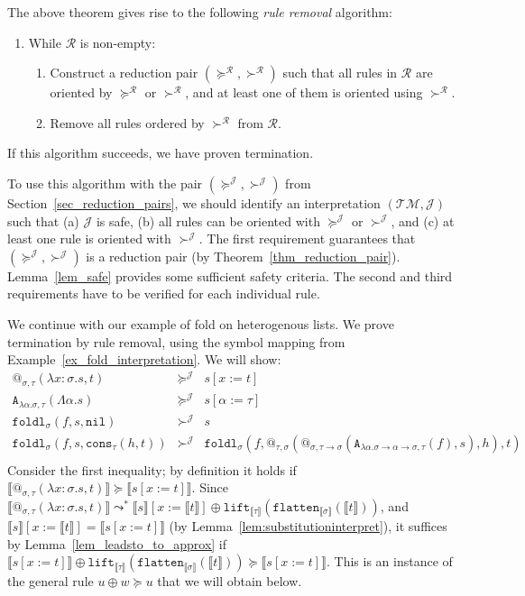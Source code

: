 \documentclass[a4paper,UKenglish,cleveref,autoref,numberwithinsect]{lipics-v2019}
\theoremstyle{definition}
\newcommand{\Rules}{\mathcal{R}}
\newcommand{\arrtype}{\rightarrow}
\newcommand{\abs}[2]{\lambda #1.#2}
\newcommand{\tabs}[2]{\Lambda #1.#2}
\newcommand{\arrW}{\leadsto}
\newcommand{\flatten}{\mathtt{flatten}}
\newcommand{\lift}{\mathtt{lift}}
\newcommand{\typeinterpret}[1]{\llbracket #1 \rrbracket}
\newcommand{\interpret}[1]{\llbracket #1 \rrbracket}
\newcommand{\Typemap}{\mathcal{T\!M}}
\newcommand{\Termmap}{\mathcal{J}}
\newcommand{\succinterpret}{\succ^{\Termmap}}
\newcommand{\succeqinterpret}{\succeq^{\Termmap}}
\newcommand{\nil}{\mathtt{nil}}
\newcommand{\cons}{\mathtt{cons}}
\begin{document}
The above theorem gives rise to the following \emph{rule removal}
algorithm:
\begin{enumerate}
\item While $\Rules$ is non-empty:
  \begin{enumerate}
  \item Construct a reduction pair $(\succeq^\Rules,\succ^\Rules)$
    such that all rules in $\Rules$ are oriented by $\succeq^\Rules$ or
    $\succ^\Rules$, and at least one of them is oriented using
    $\succ^\Rules$.
  \item Remove all rules ordered by $\succ^\Rules$ from $\Rules$.
  \end{enumerate}
\end{enumerate}
If this algorithm succeeds, we have proven termination.

\medskip
To use this algorithm with the pair $(\succeqinterpret,\succinterpret)$
from Section~\ref{sec_reduction_pairs}, we should identify an
interpretation $(\Typemap,\Termmap)$
such that (a) $\Termmap$ is safe, (b) all rules can be oriented with
$\succeqinterpret$ or $\succinterpret$, and (c) at least one rule is
oriented with $\succinterpret$.
%
The first requirement guarantees that
$(\succeqinterpret,\succinterpret)$ is a reduction pair (by
Theorem~\ref{thm_reduction_pair}). Lemma~\ref{lem_safe} provides some
sufficient safety criteria. The second and third
requirements have to be verified for each individual rule.

\begin{example}\label{ex_fold_intermediate}
  We continue with our example of fold on heterogenous lists. We prove
  termination by rule removal, using the symbol mapping from
  Example~\ref{ex_fold_interpretation}.
  We will show:
  \[
  \begin{array}{rcl}
    @_{\sigma,\tau}(\abs{x:\sigma}{s},t) & \succeqinterpret & s[x:=t] \\
    \mathtt{A}_{\abs{\alpha}{\sigma},\tau}(\tabs{\alpha}{s}) &
      \succeqinterpret & s[\alpha:=\tau] \\
    \mathtt{foldl}_\sigma(f,s,\nil) & \succinterpret & s \\
    \mathtt{foldl}_\sigma(f,s,\cons_\tau(h,t)) & \succinterpret &
    \mathtt{foldl}_\sigma(f,@_{\tau,\sigma}(@_{\sigma,\tau
    \arrtype\sigma}(
      \mathtt{A}_{\abs{\alpha}{\sigma\arrtype\alpha\arrtype\sigma},
      \tau}(f),s),h),t) \\
  \end{array}
  \]
Consider the first inequality; by definition it holds if
$\interpret{@_{\sigma,\tau}(\abs{x:\sigma}{s},t)} \succeq
\interpret{s[x:=t]}$.
Since $\interpret{@_{\sigma,\tau}(\abs{x:
\sigma}{s},t)} \arrW^* \interpret{s}[x:=\interpret{t}] \oplus
\lift_{\typeinterpret{\tau}}(\flatten_{\typeinterpret{\sigma}}(
\interpret{t}))$, and $\interpret{s}[x:=\interpret{t}] =
\interpret{s[x:=t]}$ (by Lemma~\ref{lem:substitutioninterpret}),
it suffices by Lemma~\ref{lem_leadsto_to_approx} if
$\interpret{s[x:=t]} \oplus \lift_{\typeinterpret{\tau}}(\flatten_{\typeinterpret{\sigma}}(
\interpret{t})) \succeq \interpret{s[x:=t]}$.
This is an instance of the general rule $u \oplus w \succeq u$ that
we will obtain below.
\end{example}
\end{document}
